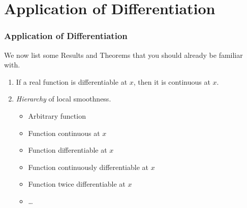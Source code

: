 \documentclass[12pt, t]{beamer}
\renewcommand{\emph}[1]{{\color{Turquoise3}\textsl{#1}}}
\begin{document}
\section{Application of Differentiation}
\begin{frame}
    \frametitle{Application of Differentiation}
    We now list some Results and Theorems that you should already be familiar with.\\
    \vspace{1em}
    \begin{enumerate}
        \item If a real function is differentiable at $x$, then it is continuous at $x$.
              \vspace{0.5em}
        \item \emph{Hierarchy} of local smoothness.
              \begin{itemize}
                  \item Arbitrary function
                  \item Function continuous at $x$
                  \item Function differentiable at $x$
                  \item Function continuously differentiable at $x$
                  \item Function twice differentiable at $x$
                  \item \dots
              \end{itemize}
    \end{enumerate}


\end{frame}
\end{document}
